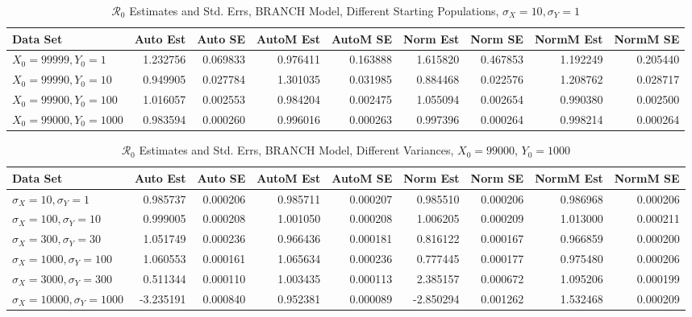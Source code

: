 \documentclass[12pt]{article}
\newcommand{\rr}{\ensuremath{\mathcal{R}_0}}
\begin{document}
\begin{table}[H]
	
	\caption{$\rr$ Estimates and Std. Errs, BRANCH Model,
		Different Starting Populations, 
		$\sigma_X = 10, \sigma_Y = 1$}
	\begin{footnotesize}
		\hskip -1.7cm
		\begin{tabular}{l|r|r|r|r|r|r|r|r}
			\hline
			Data Set & Auto Est & Auto SE & AutoM Est & AutoM SE & Norm Est & Norm SE & NormM Est & NormM SE\\
			\hline
			$X_0 = 99999, Y_0 = 1$ & 1.232756 & 0.069833 & 0.976411 & 0.163888 & 1.615820 & 0.467853 & 1.192249 & 0.205440\\
			\hline
			$X_0 = 99990, Y_0 = 10$ & 0.949905 & 0.027784 & 1.301035 & 0.031985 & 0.884468 & 0.022576 & 1.208762 & 0.028717\\
			\hline
			$X_0 = 99900, Y_0 = 100$ & 1.016057 & 0.002553 & 0.984204 & 0.002475 & 1.055094 & 0.002654 & 0.990380 & 0.002500\\
			\hline
			$X_0 = 99000, Y_0 = 1000$ & 0.983594 & 0.000260 & 0.996016 & 0.000263 & 0.997396 & 0.000264 & 0.998214 & 0.000264\\
			\hline
		\end{tabular}
	\end{footnotesize}
\end{table}

\begin{table}[H]
	
	\caption{$\rr$ Estimates and Std. Errs, BRANCH Model, 
		Different Variances, $X_0 = 99000$, $Y_0 = 1000$}
	\begin{footnotesize}
		\hskip -1.7cm
		\begin{tabular}{l|r|r|r|r|r|r|r|r}
			\hline
			Data Set & Auto Est & Auto SE & AutoM Est & AutoM SE & Norm Est & Norm SE & NormM Est & NormM SE\\
			\hline
			$\sigma_X = 10, \sigma_Y = 1$ & 0.985737 & 0.000206 & 0.985711 & 0.000207 & 0.985510 & 0.000206 & 0.986968 & 0.000206\\
			\hline
			$\sigma_X = 100, \sigma_Y = 10$ & 0.999005 & 0.000208 & 1.001050 & 0.000208 & 1.006205 & 0.000209 & 1.013000 & 0.000211\\
			\hline
			$\sigma_X = 300, \sigma_Y = 30$ & 1.051749 & 0.000236 & 0.966436 & 0.000181 & 0.816122 & 0.000167 & 0.966859 & 0.000200\\
			\hline
			$\sigma_X = 1000, \sigma_Y = 100$ & 1.060553 & 0.000161 & 1.065634 & 0.000236 & 0.777445 & 0.000177 & 0.975480 & 0.000206\\
			\hline
			$\sigma_X = 3000, \sigma_Y = 300$ & 0.511344 & 0.000110 & 1.003435 & 0.000113 & 2.385157 & 0.000672 & 1.095206 & 0.000199\\
			\hline
			$\sigma_X = 10000, \sigma_Y = 1000$& -3.235191 & 0.000840 & 0.952381 & 0.000089 & -2.850294 & 0.001262 & 1.532468 & 0.000209\\
			\hline
		\end{tabular}
	\end{footnotesize}
\end{table}
\end{document}
